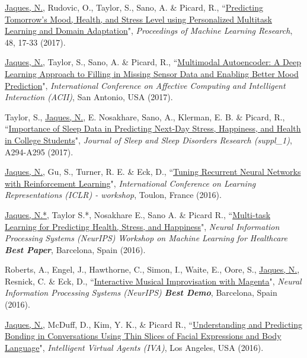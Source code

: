 \documentclass[paper=letter,fontsize=11pt]{scrartcl} %
\newcommand{\PaperEntry}[6]{
        \noindent #1, ``\href{#6}{#2}", \textit{#3}, #4 (#5).}
\begin{document}
\begin{etaremune}
\item \PaperEntry{\underline{Jaques, N.}, Rudovic, O., Taylor, S., Sano, A. \& Picard, R.}{Predicting Tomorrow’s Mood, Health, and Stress Level using Personalized Multitask Learning and Domain Adaptation}{Proceedings of Machine Learning Research}{48, 17-33}{2017}{http://proceedings.mlr.press/v66/jaques17a/jaques17a.pdf}

\item \PaperEntry{\underline{Jaques, N.}, Taylor, S., Sano, A. \& Picard, R.}{Multimodal Autoencoder: A Deep Learning Approach to Filling in Missing Sensor Data and Enabling Better Mood Prediction}{International Conference on Affective Computing and Intelligent Interaction (ACII)}{San Antonio, USA}{2017}{https://affect.media.mit.edu/pdfs/17.Jaques_autoencoder_ACII.pdf}

\item \PaperEntry{Taylor, S., \underline{Jaques, N.}, E. Nosakhare, Sano, A., Klerman, E. B. \& Picard, R.}{Importance of Sleep Data in Predicting Next-Day Stress, Happiness, and Health in College Students}{Journal of Sleep and Sleep Disorders Research (suppl\_1)}{A294-A295}{2017}{https://affect.media.mit.edu/pdfs/17.Taylor-etal-MoodPrediction-SLEEP2017-Poster.pdf}

\item \PaperEntry{\underline{Jaques, N.}, Gu, S., Turner, R. E. \& Eck, D.}{Tuning Recurrent Neural Networks with Reinforcement Learning}{International Conference on Learning Representations (ICLR) - workshop}{Toulon, France}{2016}{https://openreview.net/pdf?id=Syyv2e-Kx}

\item \PaperEntry{\underline{Jaques, N.*}, Taylor S.*, Nosakhare E., Sano A. \& Picard R.}{Multi-task Learning for Predicting Health, Stress, and Happiness}{Neural Information Processing Systems (NeurIPS) Workshop on Machine Learning for Healthcare \textbf{Best Paper}}{Barcelona, Spain}{2016}{https://pdfs.semanticscholar.org/b228/7a406985980515d5cc63e9b37fb17c5186f8.pdf}

\item \PaperEntry{Roberts, A., Engel, J., Hawthorne, C., Simon, I., Waite, E., Oore, S., \underline{Jaques, N.}, Resnick, C. \& Eck, D.}{Interactive Musical Improvisation with Magenta}{Neural Information Processing Systems (NeurIPS) \textbf{Best Demo}}{Barcelona, Spain}{2016}{https://nips.cc/Conferences/2016/Schedule?showEvent=6307}

\item \PaperEntry{\underline{Jaques, N.}, McDuff, D., Kim, Y. K., \& Picard R.}{Understanding and Predicting Bonding in Conversations Using Thin Slices of Facial Expressions and Body Language}{Intelligent Virtual Agents (IVA)}{Los Angeles, USA}{2016}{http://affect.media.mit.edu/pdfs/16.Jaques-IVAbonding.pdf}


\end{etaremune}
\end{document}

